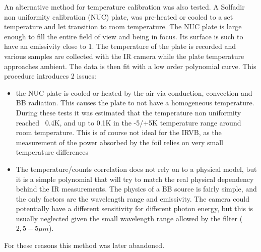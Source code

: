 An alternative method for temperature calibration was also tested. A Solfadir non uniformity calibration (NUC) plate, was pre-heated or cooled to a set temperature and let transition to room temperature. The NUC plate is large enough to fill the entire field of view and being in focus. Its surface is such to have an emissivity close to 1. The temperature of the plate is recorded and various samples are collected with the IR camera while the plate temperature approaches ambient. The data is then fit with a low order polynomial curve. This procedure introduces 2 issues:
\begin{itemize}
    \item the NUC plate is cooled or heated by the air via conduction, convection and BB radiation. This causes the plate to not have a homogeneous temperature. During these tests it was estimated that the temperature non uniformity reached ~0.4K, and up to 0.1K in the -5/+5K temperature range around room temperature. This is of course not ideal for the IRVB, as the measurement of the power absorbed by the foil relies on very small temperature differences
    \item The temperature/counts correlation does not rely on to a physical model, but it is a simple polynomial that will try to match the real physical dependency behind the IR measurements. The physics of a BB source is fairly simple, and the only factors are the wavelength range and emissivity. The camera could potentially have a different sensitivity for different photon energy, but this is usually neglected given the small wavelength range allowed by the filter ($2,5-5\mu m$).
\end{itemize}
For these reasons this method was later abandoned.

